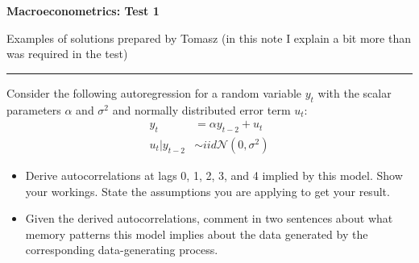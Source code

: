 \documentclass[12pt]{article}
\begin{document}
\bigskip\noindent\textbf{\LARGE Macroeconometrics: Test 1}

\bigskip\noindent Examples of solutions prepared by Tomasz (in this note I explain a bit more than was required in the test)

\smallskip\noindent\rule{5cm}{.1pt}

\normalsize

\begin{adjustwidth}{1cm}{1cm}

\begin{description}
\bigskip\item[Exercise 1. (2.5 points)] Consider the following autoregression for a random variable $y_t$ with the scalar parameters $\alpha$ and $\sigma^2$ and normally distributed error term $u_t$:
\begin{align}
y_t &= \alpha y_{t-2} + u_t\\
u_t | y_{t-2} &\sim iid\mathcal{N}\left(0, \sigma^2\right)
\end{align}
\begin{itemize}
\item Derive autocorrelations at lags 0, 1, 2, 3, and 4 implied by this model. Show your workings. State the assumptions you are applying to get your result.
\item Given the derived autocorrelations, comment in two sentences about what memory patterns this model implies about the data generated by the corresponding data-generating process.
\end{itemize}


\end{description}
\end{adjustwidth}
\end{document}
